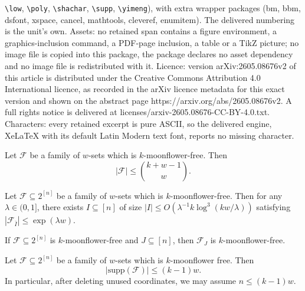 \documentclass[10pt,a4paper]{amsart}
\newcommand{\calF}{\mathcal{F}}
\newcommand{\supp}{\mathrm{supp}}
\begin{document}
\texttt{\textbackslash low}, \texttt{\textbackslash poly}, \texttt{\textbackslash shachar}, \texttt{\textbackslash supp}, \texttt{\textbackslash yimeng}), with extra wrapper packages (bm, bbm, dsfont, xspace, cancel, mathtools, cleveref, enumitem). The delivered numbering is the unit's own. Assets: no retained span contains a figure environment, a graphics-inclusion command, a PDF-page inclusion, a table or a TikZ picture; no image file is copied into this package, the package declares no asset dependency and no image file is redistributed with it. Licence: version arXiv:2605.08676v2 of this article is distributed under the Creative Commons Attribution 4.0 International licence, as recorded in the arXiv licence metadata for this exact version and shown on the abstract page https://arxiv.org/abs/2605.08676v2. A full rights notice is delivered at licenses/arxiv-2605.08676-CC-BY-4.0.txt. Characters: every retained excerpt is pure ASCII, so the delivered engine, XeLaTeX with its default Latin Modern text font, reports no missing character.
\begin{theorem}\label{main_wsf_theorem}  Let $\calF$ be a family of $w$-sets which is $k$-moonflower-free. Then 
\[
|\calF| \leq \binom{k+w-1}{w}.
\]
\end{theorem}

\begin{theorem}\label{thm:universe_reduction}
    Let $\calF \subseteq 2^{[n]}$ be a family of $w$-sets which is $k$-moonflower-free. Then for any $\lambda \in (0, 1]$, there exists $I \subseteq [n]$ of size $|I| \leq O(\lambda^{-1}k \log^3 (kw / \lambda))$ satisfying $|\calF_{\bar{I}}| \leq \exp (\lambda w)$.
\end{theorem}

\begin{lemma}\label{lem:WSF_free_preserved_under_projection} If $\calF \subseteq 2^{[n]}$ is $k$-moonflower-free and $J \subseteq [n]$, then $\calF_J$ is $k$-moonflower-free.
\end{lemma}

\begin{lemma}\label{lem:moonflower_free_family_have_small_support}Let $\calF \subseteq 2^{[n]}$ be a family of $w$-sets which is $k$-moonflower free. Then
\[
|\supp (\calF)| \leq (k-1)w.
\]
In particular, after deleting unused coordinates, we may assume $n \leq (k-1)w$. 
\end{lemma}
\end{document}
